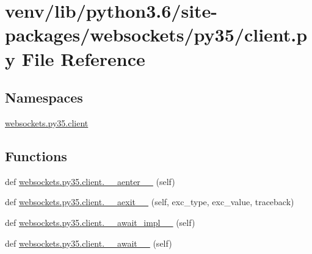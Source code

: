 \hypertarget{venv_2lib_2python3_86_2site-packages_2websockets_2py35_2client_8py}{}\section{venv/lib/python3.6/site-\/packages/websockets/py35/client.py File Reference}
\label{venv_2lib_2python3_86_2site-packages_2websockets_2py35_2client_8py}
\subsection*{Namespaces}
\begin{DoxyCompactItemize}
\item 
 \hyperlink{namespacewebsockets_1_1py35_1_1client}{websockets.\+py35.\+client}
\end{DoxyCompactItemize}
\subsection*{Functions}
\begin{DoxyCompactItemize}
\item 
def \hyperlink{namespacewebsockets_1_1py35_1_1client_a40ff411618ec0c37eaf7bab4b1b65390}{websockets.\+py35.\+client.\+\_\+\+\_\+aenter\+\_\+\+\_\+} (self)
\item 
def \hyperlink{namespacewebsockets_1_1py35_1_1client_af7aa5d80257aa9410fa05862e14d68b5}{websockets.\+py35.\+client.\+\_\+\+\_\+aexit\+\_\+\+\_\+} (self, exc\+\_\+type, exc\+\_\+value, traceback)
\item 
def \hyperlink{namespacewebsockets_1_1py35_1_1client_a0eaefdf545189df00aea785e7951c0b4}{websockets.\+py35.\+client.\+\_\+\+\_\+await\+\_\+impl\+\_\+\+\_\+} (self)
\item 
def \hyperlink{namespacewebsockets_1_1py35_1_1client_abf305ff009cfe668c825ca0632befa21}{websockets.\+py35.\+client.\+\_\+\+\_\+await\+\_\+\+\_\+} (self)
\end{DoxyCompactItemize}
